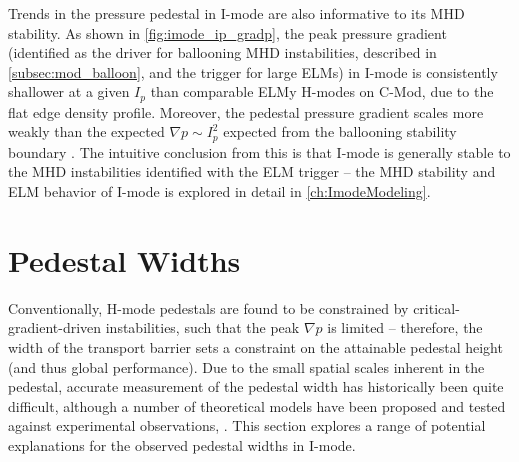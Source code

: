Trends in the pressure pedestal in I-mode are also informative to its MHD stability.  As shown in \cref{fig:imode_ip_gradp}, the peak pressure gradient (identified as the driver for ballooning MHD instabilities, described in \cref{subsec:mod_balloon}, and the trigger for large ELMs) in I-mode is consistently shallower at a given $I_p$ than comparable ELMy H-modes on C-Mod, due to the flat edge density profile.  Moreover, the pedestal pressure gradient scales more weakly than the expected $\nabla p \sim I_p^2$ expected from the ballooning stability boundary \cite{Connor1978}.  The intuitive conclusion from this is that I-mode is generally stable to the MHD instabilities identified with the ELM trigger -- the MHD stability and ELM behavior of I-mode is explored in detail in \cref{ch:ImodeModeling}.\nicesectionending

\begin{figure}[t]
 \pushtooutside
\end{figure}

\section{Pedestal Widths}\label{sec:imode_width}

Conventionally, H-mode pedestals are found to be constrained by critical-gradient-driven instabilities, such that the peak $\nabla p$ is limited -- therefore, the width of the transport barrier sets a constraint on the attainable pedestal height (and thus global performance).  Due to the small spatial scales inherent in the pedestal, accurate measurement of the pedestal width has historically been quite difficult, although a number of theoretical models have been proposed and tested against experimental observations, \eg \cite{Maggi2010,Beurskens2011,Onjun2002}.  This section explores a range of potential explanations for the observed pedestal widths in I-mode.

